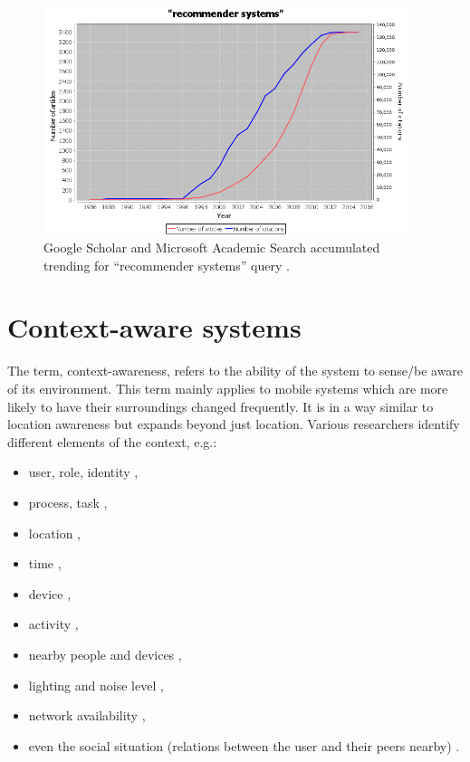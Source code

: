 \begin{figure}
	\centering
	\includegraphics[width=0.95\textwidth]{scholar-recommender-systems}
	\caption{Google Scholar and Microsoft Academic Search accumulated trending for ``recommender systems'' query \cite{Rus:scholar-trends}.}
	\label{fig:scholar-recommender-systems}
\end{figure}

\section{Context-aware systems}
\label{sec:context-aware}

The term, context-awareness, refers to the ability of the system to sense/be aware of its environment. This term mainly applies to mobile systems which are more likely to have their surroundings changed frequently. It is in a way similar to location awareness but expands beyond just location. Various researchers identify different elements of the context, e.g.:

\begin{itemize}
	\item user, role, identity \cite{Dey:context} \cite{Kaltz:context},
	\item process, task \cite{Kaltz:context},
	\item location \cite{Dey:context} \cite{Kaltz:context},
	\item time \cite{Dey:context} \cite{Kaltz:context},
	\item device \cite{Kaltz:context},
	\item activity \cite{Dey:context},
	\item nearby people and devices \cite{Rosslin:context},
	\item lighting and noise level \cite{Rosslin:context},
	\item network availability \cite{Rosslin:context},
	\item even the social situation (relations between the user and their peers nearby) \cite{Rosslin:context}.
\end{itemize}

